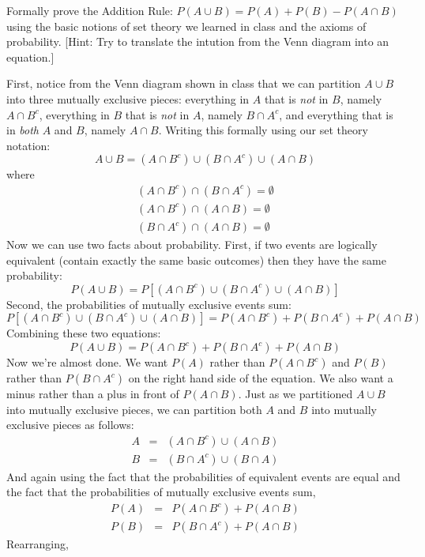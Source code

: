 \documentclass[addpoints,12pt]{exam}
\begin{document}
\begin{questions}
\question Formally prove the Addition Rule: $P(A \cup B) = P(A) + P(B) - P(A \cap B)$ using the basic notions of set theory we learned in class and the axioms of probability. [Hint: Try to translate the intution from the Venn diagram into an equation.]
	\begin{solution}
		First, notice from the Venn diagram shown in class that we can partition $A\cup B$ into three mutually exclusive pieces: everything in $A$ that is \emph{not} in $B$, namely $A \cap B^c$,  everything in $B$ that is \emph{not} in $A$, namely $B \cap A^c$, and everything that is in \emph{both} $A$ and $B$, namely $A\cap B$. Writing this formally using our set theory notation:
		$$A \cup B = (A \cap B^c) \cup (B \cap A^c) \cup (A\cap B)$$
			where
			\begin{eqnarray*}
				(A \cap B^c) \cap (B \cap A^c)= \emptyset\\
				(A \cap B^c) \cap (A\cap B)= \emptyset\\
				(B \cap A^c) \cap (A\cap B) = \emptyset
			\end{eqnarray*}
		Now we can use two facts about probability. First, if two events are logically equivalent (contain exactly the same basic outcomes) then they have the same probability:
		$$P(A \cup B) = P\left[(A \cap B^c) \cup (B \cap A^c) \cup (A\cap B)\right]$$
Second, the probabilities of mutually exclusive events sum:
		$$P\left[(A \cap B^c) \cup (B \cap A^c) \cup (A\cap B)\right] = P(A \cap B^c) + P(B \cap A^c) + P(A\cap B)$$
Combining these two equations:
		$$P(A \cup B) = P(A \cap B^c) + P(B \cap A^c) + P(A\cap B)$$
		Now we're almost done. We want $P(A)$ rather than $P(A \cap B^c)$ and $P(B)$ rather than $P(B \cap A^c) $ on the right hand side of the equation. We also want a minus rather than a plus in front of $P(A\cap B)$. Just as we partitioned $A\cup B$ into mutually exclusive pieces, we can partition both $A$ and $B$ into mutually exclusive pieces as follows:
		\begin{eqnarray*}
			A &=& (A\cap B^c) \cup (A \cap B)\\
			B &=& (B\cap A^c) \cup (B \cap A)
		\end{eqnarray*}
And again using the fact that the probabilities of equivalent events are equal and the fact that the probabilities of mutually exclusive events sum,
		\begin{eqnarray*}
			P(A) &=& P(A\cap B^c) + P(A \cap B)\\
			P(B) &=& P(B\cap A^c) + P(A \cap B)
		\end{eqnarray*}
Rearranging, 

\end{solution}
\end{questions}
\end{document}
